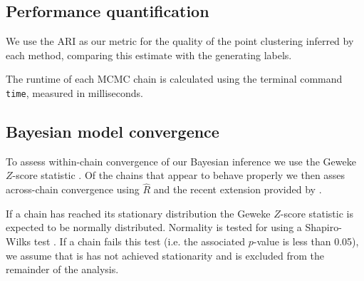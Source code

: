 \documentclass{bioinfo}
\begin{document}
\subsection{Performance quantification}
We use the ARI as our metric for the quality of the point clustering inferred by each method, comparing this estimate with the generating labels.

The runtime of each MCMC chain is calculated using the terminal command \texttt{time}, measured in milliseconds.

\subsection{Bayesian model convergence}
To assess within-chain convergence of our Bayesian inference we use the Geweke $Z$-score statistic \citep{geweke1991evaluating}. Of the chains that appear to behave properly we then asses across-chain convergence using $\hat{R}$ \citep{gelman1992inference} and the recent extension provided by \cite{vats2018revisiting}. 

If a chain has reached its stationary distribution the Geweke $Z$-score statistic is expected to be normally distributed. Normality is tested for using a Shapiro-Wilks test \citep{shapiro1965analysis}. If a chain fails this test (i.e. the associated $p$-value is less than 0.05), we assume that is has not achieved stationarity and is excluded from the remainder of the analysis.
\end{document}

